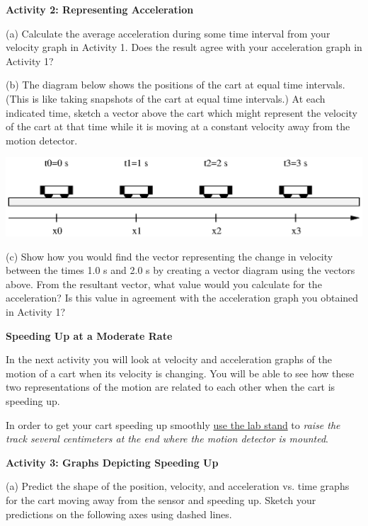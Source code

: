 \textbf{Activity 2: Representing Acceleration} 

(a) Calculate the average acceleration during some time interval from your velocity graph in Activity 1.  Does the result agree with your acceleration graph in Activity 1?
\vspace{20mm}

(b) The diagram below shows the positions of the cart at equal time intervals.
(This is like taking snapshots of the cart at equal time intervals.) At each
indicated time, sketch a vector above the cart which might represent the velocity
of the cart at that time while it is moving at a constant velocity away from
the motion detector.

\vspace{0.3cm}
{\par\centering \includegraphics{changing/changing_fig3.eps} \par}
\vspace{0.3cm}

(c) Show how you would find the vector representing the change in velocity
between the times 1.0 s and 2.0 s by creating a vector diagram using the 
vectors above. From the resultant vector, what value would you calculate for 
the acceleration? Is this value in agreement
with the acceleration graph you obtained in Activity 1?
\vspace{20mm}

\textbf{Speeding Up at a Moderate Rate} 

In the next activity you will look at velocity and acceleration graphs of the
motion of a cart when its velocity is changing. You will be able to see how
these two representations of the motion are related to each other when the cart
is speeding up.

In order to get your cart speeding up smoothly \underline{use the lab stand} to \textit{raise the
track several centimeters at the end where the motion detector is mounted}.

\textbf{Activity 3: Graphs Depicting Speeding Up} 

(a) Predict the shape of the position, velocity, and acceleration vs. time graphs
for the cart moving away from the sensor and speeding up. Sketch your predictions
on the following axes using dashed lines.

